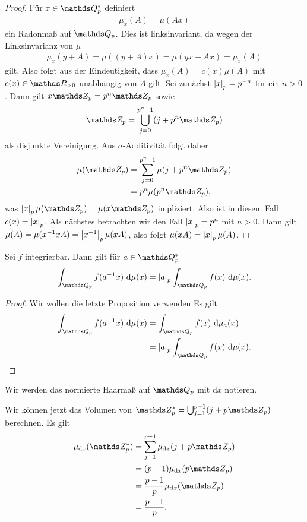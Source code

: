 \begin{proof}
Für $x \in \Q_p^\ast$ definiert
\begin{align*}
\mu_x(A)=\mu(Ax)
\end{align*}
ein Radonmaß auf $\Q_p$.
Dies ist linksinvariant, da wegen der Linksinvarianz von $\mu$
\begin{align*}
\mu_x(y+A)=\mu((y+A)x)=\mu(yx+Ax)=\mu_x(A)
\end{align*}
gilt.
Also folgt aus der Eindeutigkeit, dass $\mu_x(A)=c(x)\mu(A)$ mit $c(x)\in \R_{> 0}$ unabhängig von $A$ gilt.
Sei zunächst $\left\vert x\right\vert_p=p^{-n}$ für ein $n>0$.
Dann gilt $x\Z_p=p^n\Z_p$ sowie 
\begin{align*}
\Z_p=\bigcup_{j=0}^{p^n-1}(j+p^n\Z_p)
\end{align*}
als disjunkte Vereinigung.
Aus $\sigma$-Additivität folgt daher
\begin{align*}
\mu(\Z_p)&=\sum_{j=0}^{p^n-1} \mu(j+p^n\Z_p)\\
&=p^n \mu(p^n \Z_p),
\end{align*}
was $\abs{x}_p\mu(\Z_p)=\mu(x\Z_p)$ impliziert.
Also ist in diesem Fall $c(x)=\left\vert x\right\vert_p$.
Als nächstes betrachten wir den Fall $\left\vert x\right\vert_p=p^n$ mit $n>0$.
Dann gilt
$\mu(A)=\mu(x^{-1}xA)=\left\vert x^{-1}\right\vert_p\mu(xA)$,
also folgt $\mu(xA)=\left\vert x\right\vert_p\mu(A)$.
\end{proof}

\begin{cor}
Sei $f$ integrierbar. Dann gilt für $a \in \Q_p^\ast$
\begin{align*}
\int_{\Q_p}f(a^{-1}x)~\mathrm{d}\mu(x)=\abs{a}_p\int_{\Q_p}f(x)~\mathrm{d}\mu(x).
\end{align*}
\end{cor}
\begin{proof}
Wir wollen die letzte Proposition verwenden
Es gilt 
\begin{align*}
\int_{\Q_p}f(a^{-1}x)~\mathrm{d}\mu(x)&=\int_{\Q_p} f(x)~\mathrm{d}\mu_a(x)\\
&=\abs{a}_p \int_{\Q_p} f(x)~\mathrm{d}\mu(x).
\end{align*}
\qedhere
\end{proof}
Wir werden das normierte Haarmaß auf $\Q_p$ mit $\mathrm{d}x$ notieren.


\begin{bsp}
Wir können jetzt das Volumen von $\Z_p^\ast=\bigcup_{j=1}^{p-1}(j+p\Z_p)$ berechnen.
Es gilt
\begin{align*}
\mu_{\mathrm{d}x}(\Z_p^\ast)&=\sum_{j=1}^{p-1} \mu_{\mathrm{d}x}(j+p\Z_p)\\
&=(p-1)\mu_{\mathrm{d}x}(p \Z_p)\\
&=\frac{p-1}{p}\mu_{\mathrm{d}x}(\Z_p)\\
&=\frac{p-1}{p}.
\end{align*}
\end{bsp}

